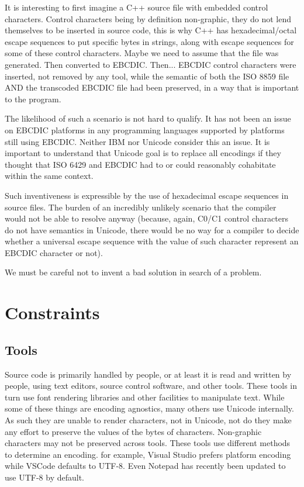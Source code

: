 \documentclass{wg21}
\begin{document}
It is interesting to first imagine a C++ source file with embedded control characters. Control characters being by definition non-graphic,
they do not lend themselves to be inserted in source code, this is why C++ has hexadecimal/octal escape sequences to put specific bytes in strings,
along with escape sequences for some of these control characters.
Maybe we need to assume that the file was generated. Then converted to EBCDIC. Then... EBCDIC control characters were inserted, not removed by any tool,
while the semantic of both the ISO 8859 file AND the transcoded EBCDIC file had been preserved, in a way that is important to the program.

The likelihood of such a scenario is not hard to qualify.
It has not been an issue on EBCDIC platforms in any programming languages supported by platforms still using EBCDIC.
Neither IBM nor Unicode consider this an issue.
It is important to understand that Unicode goal is to replace all encodings if they thought that ISO 6429 and EBCDIC had to or could reasonably
cohabitate within the same context.

Such inventiveness is expressible by the use of hexadecimal escape sequences in source files.
The burden of an incredibly unlikely scenario that the compiler would not be able to resolve anyway (because, again, C0/C1 control characters do not have semantics in Unicode, there would be no way for a compiler to decide whether a universal escape sequence with the value of such character represent an EBCDIC character or not).

We must be careful not to invent a bad solution in search of a problem.


\section{Constraints}
\subsection{Tools}

Source code is primarily handled by people, or at least it is read and written by people,
using text editors, source control software, and other tools.
These tools in turn use font rendering libraries and other facilities to manipulate text.
While some of these things are encoding agnostics, many others use Unicode internally.
As such they are unable to render characters, not in Unicode, not do they make any effort to preserve the values of the bytes of characters.
Non-graphic characters may not be preserved across tools.
These tools use different methods to determine an encoding.
for example, Visual Studio prefers platform encoding while VSCode defaults to UTF-8.
Even Notepad has recently been updated to use UTF-8 by default.
\end{document}
